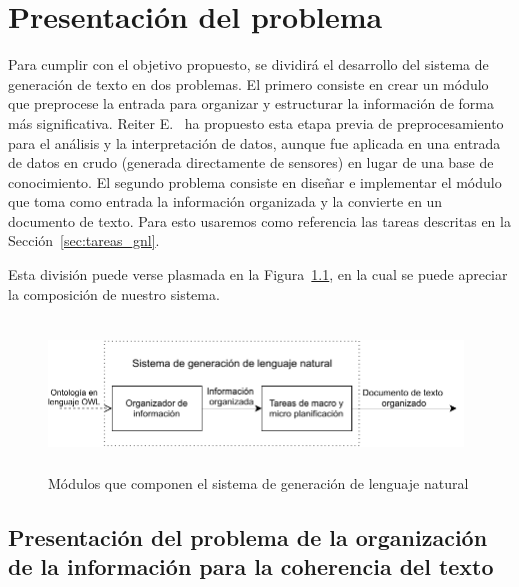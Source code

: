 \chapter{Presentación del problema}

Para cumplir con el objetivo propuesto, se dividirá el desarrollo del sistema de generación de texto en dos problemas. El primero consiste en crear un módulo que preprocese la entrada para organizar y estructurar la información de forma más significativa. Reiter E.~\cite{reiter2007architecture} ha propuesto esta etapa previa de preprocesamiento para el análisis y la interpretación de datos, aunque fue aplicada en una entrada de datos en crudo (generada directamente de sensores) en lugar de una base de conocimiento.
El segundo problema consiste en diseñar e implementar el módulo que toma como entrada la información organizada y la convierte en un documento de texto. Para esto usaremos como referencia las tareas descritas en la Sección~\ref{sec:tareas_gnl}.


Esta división puede verse plasmada en la Figura~\ref{fig:modulos_sgln}, en la cual se puede apreciar la composición de nuestro sistema.


\begin{figure}
    \centering
    \includegraphics[width=11cm, height=4cm]{img/presentacion_problema/modulos_sgln.pdf}
    \caption{Módulos que componen el sistema de generación de lenguaje natural}
    \label{fig:modulos_sgln}
\end{figure}

\section{Presentación del problema de la organización de la información para la coherencia del texto}
\label{sec:problema_coherencia-texto}

